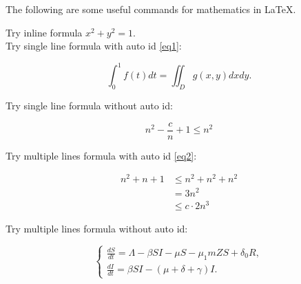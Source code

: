 \documentclass{homework}
\begin{document}
%
%
\begin{homeworkProblem}
    The following are some useful commands for mathematics in \LaTeX.

    \solution

    Try inline formula $x^2+y^2=1$. \\
    
    Try single line formula with auto id \ref{eq1}:

    \begin{equation}\label{eq1}
        \int_0^1f(t)dt = \iint_Dg(x,y)dxdy.
    \end{equation}

    Try single line formula without auto id:

    \begin{equation*}
        n^2 - \dfrac{c}{n} + 1 \leq n^2
    \end{equation*}

    Try multiple lines formula with auto id \ref{eq2}:

    \begin{equation}\label{eq2}
        \begin{split}
            n^2 + n + 1 &\leq n^2 + n^2 + n^2 \\
            &= 3n^2 \\
            &\leq c \cdot 2n^3
        \end{split}
    \end{equation}

    Try multiple lines formula without auto id:

    \begin{equation*}
        \begin{cases}
            \frac{dS}{dt} = \Lambda - \beta SI - \mu S -\mu_1 mZS + \delta_0R, \\
            \frac{dI}{dt} = \beta SI - (\mu+\delta+\gamma)I.
        \end{cases}
    \end{equation*}
    
\end{homeworkProblem}


\pagebreak
\end{document}

